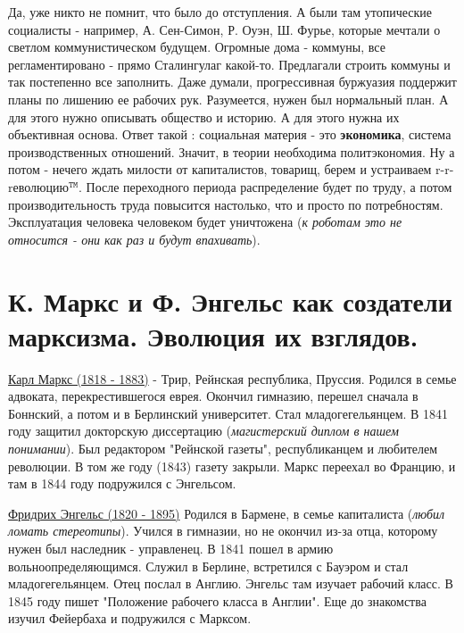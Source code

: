 Да, уже никто не помнит, что было до отступления. А были там утопические социалисты - например, А. Сен-Симон, Р. Оуэн, Ш. Фурье, которые мечтали о светлом коммунистическом будущем. Огромные дома - коммуны, все регламентировано - прямо Сталингулаг какой-то. Предлагали строить коммуны и так постепенно все заполнить. Даже думали, прогрессивная буржуазия поддержит планы по лишению ее рабочих рук. Разумеется, нужен был нормальный план. А для этого нужно описывать общество и историю. А для этого нужна их объективная основа. Ответ такой : социальная материя - это \textbf{экономика}, система производственных отношений. Значит, в теории необходима политэкономия. Ну а потом - нечего ждать милости от капиталистов, товарищ, берем и устраиваем r-r-rеволюцию${}^\mathtt{TM}$. После переходного периода распределение будет по труду, а потом производительность труда повысится настолько, что и просто по потребностям. Эксплуатация человека человеком будет уничтожена (\textit{к роботам это не относится - они как раз и будут впахивать}). 

\section{К. Маркс и Ф. Энгельс как создатели марксизма. Эволюция их взглядов.}
\underline{Карл Маркс (1818 - 1883)} - Трир, Рейнская республика, Пруссия. Родился в семье адвоката, перекрестившегося еврея. Окончил гимназию, перешел сначала в Боннский, а потом и в Берлинский университет. Стал младогегельянцем. В 1841 году защитил докторскую диссертацию (\textit{магистерский диплом в нашем понимании}). Был редактором "Рейнской газеты", республиканцем и любителем революции. В том же году (1843) газету закрыли. Маркс переехал во Францию, и там в 1844 году подружился с Энгельсом.
 
\underline{Фридрих Энгельс (1820 - 1895)} Родился в Бармене, в семье капиталиста (\textit{любил ломать стереотипы}). Учился в гимназии, но не окончил из-за отца, которому нужен был наследник - управленец. В 1841 пошел в армию вольноопределяющимся. Служил в Берлине, встретился с Бауэром и стал младогегельянцем. Отец послал в Англию. Энгельс там изучает рабочий класс. В 1845 году пишет "Положение рабочего класса в Англии". Еще до знакомства изучил Фейербаха и подружился с Марксом. 

